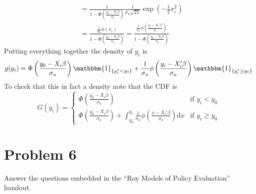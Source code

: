 \documentclass{article}
\begin{document}
\begin{solution}
\begin{align*}
    &= \frac{1}{1-\Phi\left(\frac{y_0-X_i\beta}{\sigma_u}\right)} \frac{1}{\sigma_u\sqrt{2\pi}} \exp\left(-\frac{1}{2}x_i^2\right) \\
     &= \frac{\frac{1}{\sigma_u}\phi(x_i)}{1-\Phi\left(\frac{y_0-X_i\beta}{\sigma_u}\right)}
     = \frac{\frac{1}{\sigma_u}\phi\left(\frac{y_i-X_i'\beta}{\sigma_u}\right)}{1-\Phi\left(\frac{y_0-X_i\beta}{\sigma_u}\right)}
\end{align*}
Putting everything together the density of $y_i$ is 
\begin{equation}
    g(y_i) = \Phi\left(\frac{y_0-X_i\beta}{\sigma_u}\right)\mathbbm{1}_{\{y_i^*<y_0\}} + \frac{1}{\sigma_u}\phi\left(\frac{y_i-X_i'\beta}{\sigma_u}\right)\mathbbm{1}_{\{y_i^*\geq y_0\}}
\end{equation}
To check that this in fact a density note that the CDF is 
\begin{equation*}
    G(y_i) = \begin{cases}
    \Phi\left(\frac{y_0-X_i\beta}{\sigma_u}\right) &\mbox{if } y_i<y_0 \\ 
    \Phi\left(\frac{y_0-X_i\beta}{\sigma_u}\right)  +\int_{y_0}^{y_i}\frac{1}{\sigma_u}\phi\left(\frac{x-X_i'\beta}{\sigma_u}\right) \mathrm{d}x &\mbox{if } y_i\geq y_0
    \end{cases}
\end{equation*}
\end{solution}

\newpage

\section*{Problem 6}
Answer the questions embedded in the ``Roy Models of Policy Evaluation'' handout.
\end{document}
